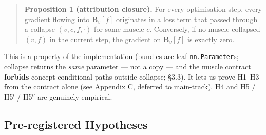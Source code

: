 \begin{quote}
\textbf{Proposition 1 (attribution closure).} For every optimisation
step, every gradient flowing into \(\mathbf{B}_v[f]\) originates in
a loss term that passed through a collapse
\((v, c, f, \cdot)\) for some muscle \(c\). Conversely, if no muscle
collapsed \((v, f)\) in the current step, the gradient on
\(\mathbf{B}_v[f]\) is exactly zero.
\end{quote}

This is a property of the implementation (bundles are leaf
\texttt{nn.Parameter}s; collapse returns the \emph{same} parameter --- not a copy
--- and the muscle contract \textbf{forbids} concept-conditional paths
outside collapse; §3.3). It lets us prove H1--H3 from the contract
alone (see Appendix C, deferred to main-track). H4 and H5 / H5′ /
H5″ are genuinely empirical.

\subsection{Pre-registered Hypotheses}

